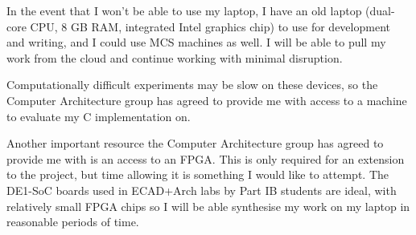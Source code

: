 In the event that I won't be able to use my laptop, I have an old laptop (dual-core CPU, 8 GB RAM, integrated Intel graphics chip) to use for development and writing, and I could use MCS machines as well.
I will be able to pull my work from the cloud and continue working with minimal disruption.

Computationally difficult experiments may be slow on these devices, so the Computer Architecture group has agreed to provide me with access to a machine to evaluate my C implementation on.

Another important resource the Computer Architecture group has agreed to provide me with is an access to an FPGA.
This is only required for an extension to the project, but time allowing it is something I would like to attempt.
The DE1-SoC boards used in ECAD+Arch labs by Part IB students are ideal, with relatively small FPGA chips so I will be able synthesise my work on my laptop in reasonable periods of time.
